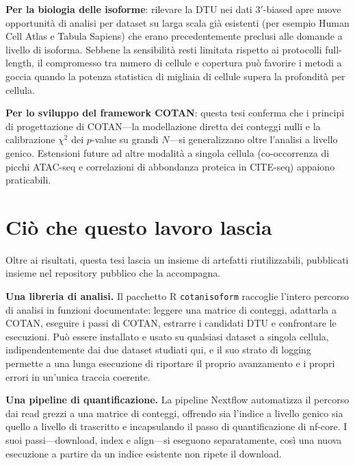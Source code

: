 \textbf{Per la biologia delle isoforme}: rilevare la DTU nei dati $3'$-biased apre nuove opportunità di analisi per dataset su larga scala già esistenti (per esempio Human Cell Atlas e Tabula Sapiens) che erano precedentemente preclusi alle domande a livello di isoforma. Sebbene la sensibilità resti limitata rispetto ai protocolli full-length, il compromesso tra numero di cellule e copertura può favorire i metodi a goccia quando la potenza statistica di migliaia di cellule supera la profondità per cellula.

\textbf{Per lo sviluppo del framework COTAN}: questa tesi conferma che i principi di progettazione di COTAN---la modellazione diretta dei conteggi nulli e la calibrazione $\chi^2$ dei $p$-value su grandi $N$---si generalizzano oltre l'analisi a livello genico. Estensioni future ad altre modalità a singola cellula (co-occorrenza di picchi ATAC-seq e correlazioni di abbondanza proteica in CITE-seq) appaiono praticabili.

\section{Ciò che questo lavoro lascia}

Oltre ai risultati, questa tesi lascia un insieme di artefatti riutilizzabili, pubblicati insieme nel repository pubblico che la accompagna.

\textbf{Una libreria di analisi.} Il pacchetto R \texttt{cotanisoform} raccoglie l'intero percorso di analisi in funzioni documentate: leggere una matrice di conteggi, adattarla a COTAN, eseguire i passi di COTAN, estrarre i candidati DTU e confrontare le esecuzioni. Può essere installato e usato su qualsiasi dataset a singola cellula, indipendentemente dai due dataset studiati qui, e il suo strato di logging permette a una lunga esecuzione di riportare il proprio avanzamento e i propri errori in un'unica traccia coerente.

\textbf{Una pipeline di quantificazione.} La pipeline Nextflow automatizza il percorso dai read grezzi a una matrice di conteggi, offrendo sia l'indice a livello genico sia quello a livello di trascritto e incapsulando il passo di quantificazione di nf-core. I suoi passi---download, index e align---si eseguono separatamente, così una nuova esecuzione a partire da un indice esistente non ripete il download.

